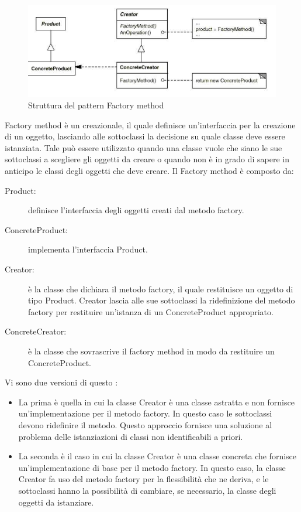 	 \label{app:factorymethod}
	\begin{figure}[H]\centering
    \includegraphics[scale=0.5]{SpecificaTecnica/Pics/FactoryMethod}
    \caption{Struttura del pattern Factory method}
	\end{figure}
	Factory method è un  creazionale, il quale definisce un'interfaccia per la creazione di un oggetto, lasciando alle sottoclassi la decisione su quale classe deve essere istanziata. 
	Tale  può essere utilizzato quando una classe vuole che siano le sue sottoclassi a scegliere gli oggetti da creare o quando non è in grado di sapere in anticipo le classi degli oggetti che deve creare.
	Il  Factory method è composto da:
	\begin{description}
		\item[Product:] definisce l'interfaccia degli oggetti creati dal metodo factory.
		\item[ConcreteProduct:] implementa l'interfaccia Product.
		\item[Creator:] è la classe che dichiara il metodo factory, il quale restituisce un oggetto di tipo Product. Creator lascia alle sue sottoclassi la ridefinizione del metodo factory per restituire un'istanza di un ConcreteProduct appropriato.
		\item[ConcreteCreator:] è la classe che sovrascrive il factory method in modo da restituire un ConcreteProduct.
	\end{description}
	Vi sono due versioni di questo :
	\begin{itemize}
		\item La prima è quella in cui la classe Creator è una classe astratta e non fornisce un'implementazione per il metodo factory. In questo caso le sottoclassi devono ridefinire il metodo. Questo approccio fornisce una soluzione al problema delle istanziazioni di classi non identificabili a priori. 
		\item La seconda è il caso in cui la classe Creator è una classe concreta che fornisce un'implementazione di base per il metodo factory.
		In questo caso, la classe Creator fa uso del metodo factory per la flessibilità che ne deriva, e le sottoclassi hanno la possibilità di cambiare, se necessario, la classe degli oggetti da istanziare.
	\end{itemize}
